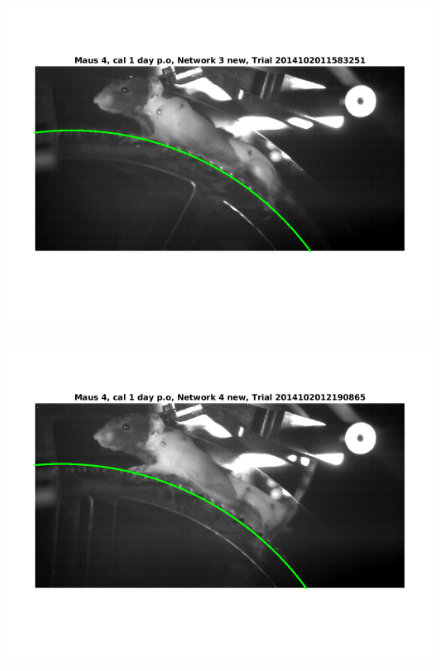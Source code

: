 \documentclass[
	fontsize=12pt,
	paper=a4,
	twoside=false,
	numbers=noenddot,
	plainheadsepline,
	toc=listof,
	toc=bibliography
]{scrartcl}
\begin{document}
\begin{figure} [htb] \centering
	\includegraphics[scale = 0.6]{images/mouse4/result_Maus_4_cal_1_day_Network_3_new.png}
\end{figure}
\begin{figure} [htb] \centering
	\includegraphics[scale = 0.6]{images/mouse4/result_Maus_4_cal_1_day_Network_4_new.png}
\end{figure}



\end{document}

